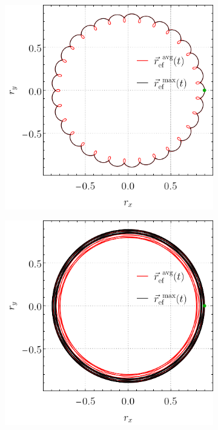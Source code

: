 \begin{figure}[ht!]
    \centering
    \begin{subfigure}{0.5\textwidth}
      \centering
      \includegraphics[width=0.8\linewidth]{appendices/figures/local_AvgVSMax_p2=0.1_r=0.9_w1=30_w2=1.png}
    \end{subfigure}%
    \begin{subfigure}{0.5\textwidth}
      \centering
      \includegraphics[width=0.8\linewidth]{appendices/figures/local_AvgVSMax_p2=0.1_r=0.9_w1=1_w2=10.png}
    \end{subfigure}
    \caption{}\label{ap:EffDunAVGvsMaxEnt2}
\end{figure}

